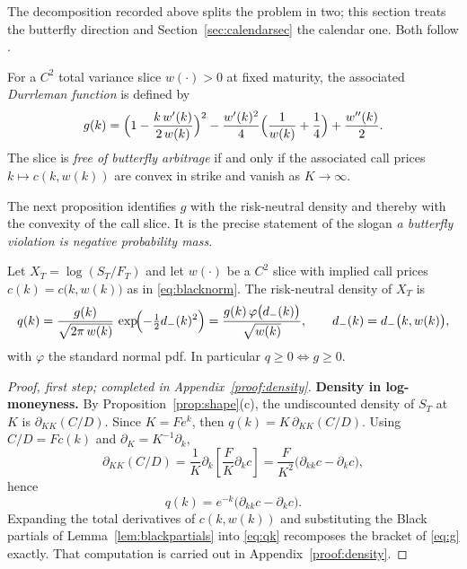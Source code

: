 The decomposition recorded above splits the problem in two; this section treats the butterfly
direction and Section~\ref{sec:calendarsec} the calendar one. Both follow
\cite{gatheraljacquier2014,durrleman2010,roper2010}.

\begin{definition}\label{def:durrleman}
For a $C^2$ total variance slice $w(\cdot)>0$ at fixed maturity, the associated
\emph{Durrleman function} is defined by
\begin{equation}\label{eq:g}
g(k)=\Bigl(1-\frac{k\,w'(k)}{2\,w(k)}\Bigr)^{2}
-\frac{w'(k)^{2}}{4}\Bigl(\frac{1}{w(k)}+\frac14\Bigr)
+\frac{w''(k)}{2}.
\end{equation}
The slice is \emph{free of butterfly arbitrage} if and only if the associated call prices
$k\mapsto c(k,w(k))$ are convex in strike and vanish as $K\to\infty$.
\end{definition}

The next proposition identifies $g$ with the risk-neutral
density and thereby with the convexity of the call slice. It is the precise statement of the
slogan \emph{a butterfly violation is negative probability mass}.

\begin{proposition}\label{prop:density}
Let $X_T=\log(S_T/F_T)$ and let $w(\cdot)$ be a $C^2$ slice with implied call prices
$c(k)=c\bigl(k,w(k)\bigr)$ as in \eqref{eq:blacknorm}. The risk-neutral density of $X_T$ is
\begin{equation}\label{eq:density}
q(k)=\frac{g(k)}{\sqrt{2\pi\,w(k)}}\,
\exp\!\Bigl(-\tfrac12 d_-(k)^2\Bigr)
=\frac{g(k)\,\varphi\bigl(d_-(k)\bigr)}{\sqrt{w(k)}},
\qquad d_-(k)=d_-\bigl(k,w(k)\bigr),
\end{equation}
with $\varphi$ the standard normal pdf. In particular $q\ge 0\iff g\ge 0$.
\end{proposition}

\begin{proof}[Proof, first step; completed in Appendix~\ref{proof:density}]
\textbf{Density in log-moneyness.}
By Proposition~\ref{prop:shape}(c), the undiscounted density of $S_T$ at $K$ is
$\partial_{KK}(C/D)$. Since $K=Fe^k$, then $q(k)=K\,\partial_{KK}(C/D).$
Using $C/D=Fc(k)$ and $\partial_K=K^{-1}\partial_k$,
\[
\partial_{KK}(C/D)
=\frac1K\partial_k\left[\frac{F}{K}\partial_kc\right]
=\frac{F}{K^2}\bigl(\partial_{kk}c-\partial_kc\bigr),
\]
hence
\begin{equation}\label{eq:qk}
q(k)=e^{-k}\bigl(\partial_{kk}c-\partial_kc\bigr).
\end{equation}
Expanding the total derivatives of $c(k,w(k))$ and substituting the Black partials of
Lemma~\ref{lem:blackpartials} into \eqref{eq:qk} recomposes the bracket of \eqref{eq:g}
exactly. That computation is carried out in Appendix~\ref{proof:density}.
\end{proof}

